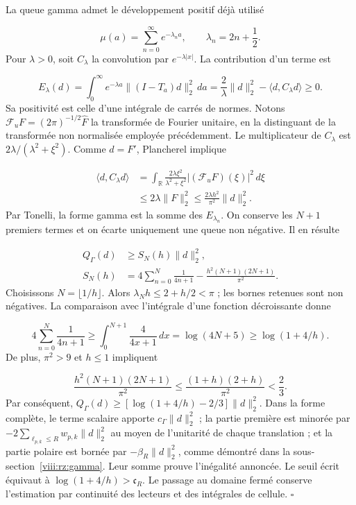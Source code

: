 La queue gamma admet le développement positif déjà utilisé

\[
\mu(a)=\sum_{n=0}^{\infty}e^{-\lambda_n a},
\qquad \lambda_n=2n+\frac12.
\]
Pour \(\lambda>0\), soit \(C_\lambda\) la convolution par \(e^{-\lambda|x|}\). La contribution d’un terme est

\[
E_\lambda(d)=\int_0^\infty e^{-\lambda a}
\|(I-T_a)d\|_2^2\,da
=\frac2\lambda\|d\|_2^2-
\langle d,C_\lambda d\rangle\geq0.
\]
Sa positivité est celle d'une intégrale de carrés de normes. Notons \(\mathcal F_u F=(2\pi)^{-1/2}\widehat F\) la transformée de Fourier unitaire, en la distinguant de la transformée non normalisée employée précédemment. Le multiplicateur de \(C_\lambda\) est \(2\lambda/(\lambda^2+\xi^2)\). Comme \(d=F'\), Plancherel implique

\[
\begin{aligned}
\langle d,C_\lambda d\rangle
&=\int_{\mathbb R}
\frac{2\lambda\xi^2}{\lambda^2+\xi^2}
|(\mathcal F_u F)(\xi)|^2\,d\xi\\
&\leq2\lambda\|F\|_2^2
\leq\frac{2\lambda h^2}{\pi^2}\|d\|_2^2.
\end{aligned}
\]
Par Tonelli, la forme gamma est la somme des \(E_{\lambda_n}\). On conserve les \(N+1\) premiers termes et on écarte uniquement une queue non négative. Il en résulte

\[
\begin{aligned}
Q_\Gamma(d)&\geq S_N(h)\|d\|_2^2,\\
S_N(h)&=4\sum_{n=0}^N\frac1{4n+1}
-\frac{h^2(N+1)(2N+1)}{\pi^2}.
\end{aligned}
\]
Choisissons \(N=\lfloor1/h\rfloor\). Alors \(\lambda_N h\leq2+h/2<\pi\) ; les bornes retenues sont non négatives. La comparaison avec l’intégrale d’une fonction décroissante donne

\[
4\sum_{n=0}^N\frac1{4n+1}
\geq\int_0^{N+1}\frac4{4x+1}\,dx
=\log(4N+5)\geq\log(1+4/h).
\]
De plus, \(\pi^2>9\) et \(h\leq1\) impliquent

\[
\frac{h^2(N+1)(2N+1)}{\pi^2}
\leq\frac{(1+h)(2+h)}{\pi^2}<\frac23.
\]
Par conséquent, \(Q_\Gamma(d)\geq[\log(1+4/h)-2/3]\|d\|_2^2\). Dans la forme complète, le terme scalaire apporte \(c_\Gamma\|d\|_2^2\) ; la partie première est minorée par \(-2\sum_{\ell_{p,k}\leq R}w_{p,k}\|d\|_2^2\) au moyen de l’unitarité de chaque translation ; et la partie polaire est bornée par \(-\beta_R\|d\|_2^2\), comme démontré dans la sous-section~\ref{viii:rz:gamma}. Leur somme prouve l’inégalité annoncée. Le seuil écrit équivaut à \(\log(1+4/h)>\mathfrak c_R\). Le passage au domaine fermé conserve l’estimation par continuité des lecteurs et des intégrales de cellule. \hfill\(\square\)

